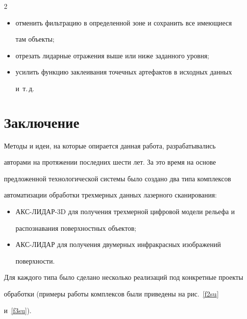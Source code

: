    \begin{multicols}{2}

   

\begin{itemize}

\item отменить фильтрацию в определенной зоне и сохранить все имеющиеся 

там объекты;

\item отрезать лидарные отражения выше или ниже заданного уровня;

\item усилить функцию заклеивания точечных артефактов в исходных данных 

и~т.\,д.

  \end{itemize}



  \section{Заключение}

   

   Методы и идеи, на которые опирается данная работа, разрабатывались 

авторами на протяжении последних шести лет. За это время на основе 

предложенной технологической системы было создано два типа комплексов 

автоматизации обработки трехмерных данных лазерного сканирования:

   \begin{itemize}

\item АКС-ЛИДАР-3D для получения трехмерной цифровой модели рельефа и 

распознавания поверхностных объектов;

\item АКС-ЛИДАР для получения двумерных инфракрасных изображений 

поверхности.

\end{itemize}



Для каждого типа было сделано несколько реализаций под конкретные проекты 

обработки (примеры работы комплексов были приведены на рис.~\ref{f2su}

и~\ref{f3su}).




\end{multicols}

